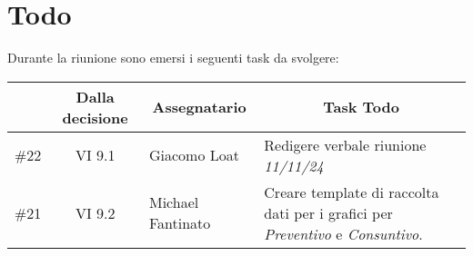 

\section{Todo}

Durante la riunione sono emersi i seguenti task da svolgere:

\vspace{0.5cm}

\begin{table}[htbp]
\centering
{}
\begin{tabular}{|c|c|p{}|p{}|}
    \hline
    \rowcolor[gray]{0.75}
    \multicolumn{1}{|c|}{\textbf{Codice}} & \multicolumn{1}{|c|}{\textbf{Dalla decisione}} & \multicolumn{1}{|c|}{\textbf{Assegnatario}} & \multicolumn{1}{|c|}{\textbf{Task Todo}} \\
    \hline
    \#22 & VI 9.1 & Giacomo Loat & Redigere verbale riunione \emph{11/11/24} \\
    \hline
    \#21 & VI 9.2 & Michael Fantinato & Creare template di raccolta dati per i grafici per \emph{Preventivo} e \emph{Consuntivo}. \\
    \hline
\end{tabular}
\end{table}
